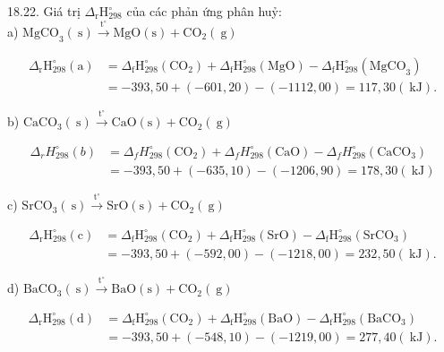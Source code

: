 \documentclass[10pt]{article}
\begin{document}
18.22. Giá trị $\Delta_{\mathrm{r}} \mathrm{H}_{298}^{\circ}$ của các phản ứng phân huỷ:\\
a) $\mathrm{MgCO}_{3}(\mathrm{~s}) \xrightarrow{\mathrm{t}^{\circ}} \mathrm{MgO}(\mathrm{s})+\mathrm{CO}_{2}(\mathrm{~g})$

$$
\begin{aligned}
\Delta_{\mathrm{r}} \mathrm{H}_{298}^{\circ}(\mathrm{a}) & =\Delta_{\mathrm{f}} \mathrm{H}_{298}^{\circ}\left(\mathrm{CO}_{2}\right)+\Delta_{\mathrm{f}} \mathrm{H}_{298}^{\circ}(\mathrm{MgO})-\Delta_{\mathrm{f}} \mathrm{H}_{298}^{\circ}\left(\mathrm{MgCO}_{3}\right) \\
& =-393,50+(-601,20)-(-1112,00)=117,30(\mathrm{~kJ}) .
\end{aligned}
$$

b) $\mathrm{CaCO}_{3}(\mathrm{~s}) \xrightarrow{\mathrm{t}^{\circ}} \mathrm{CaO}(\mathrm{s})+\mathrm{CO}_{2}(\mathrm{~g})$

$$
\begin{aligned}
\Delta_{r} H_{298}^{\circ}(b) & =\Delta_{f} H_{298}^{\circ}\left(\mathrm{CO}_{2}\right)+\Delta_{f} H_{298}^{\circ}(\mathrm{CaO})-\Delta_{f} H_{298}^{\circ}\left(\mathrm{CaCO}_{3}\right) \\
& =-393,50+(-635,10)-(-1206,90)=178,30(\mathrm{~kJ})
\end{aligned}
$$

c) $\mathrm{SrCO}_{3}(\mathrm{~s}) \xrightarrow{\mathrm{t}^{\circ}} \mathrm{SrO}(\mathrm{s})+\mathrm{CO}_{2}(\mathrm{~g})$

$$
\begin{aligned}
\Delta_{\mathrm{r}} \mathrm{H}_{298}^{\circ}(\mathrm{c}) & =\Delta_{\mathrm{f}} \mathrm{H}_{298}^{\circ}\left(\mathrm{CO}_{2}\right)+\Delta_{\mathrm{f}} \mathrm{H}_{298}^{\circ}(\mathrm{SrO})-\Delta_{\mathrm{f}} \mathrm{H}_{298}^{\circ}\left(\mathrm{SrCO}_{3}\right) \\
& =-393,50+(-592,00)-(-1218,00)=232,50(\mathrm{~kJ}) .
\end{aligned}
$$

d) $\mathrm{BaCO}_{3}(\mathrm{~s}) \xrightarrow{\mathrm{t}^{\circ}} \mathrm{BaO}(\mathrm{s})+\mathrm{CO}_{2}(\mathrm{~g})$

$$
\begin{aligned}
\Delta_{\mathrm{r}} \mathrm{H}_{298}^{\circ}(\mathrm{d}) & =\Delta_{\mathrm{f}} \mathrm{H}_{298}^{\circ}\left(\mathrm{CO}_{2}\right)+\Delta_{\mathrm{f}} \mathrm{H}_{298}^{\circ}(\mathrm{BaO})-\Delta_{\mathrm{f}} \mathrm{H}_{298}^{\circ}\left(\mathrm{BaCO}_{3}\right) \\
& =-393,50+(-548,10)-(-1219,00)=277,40(\mathrm{~kJ}) .
\end{aligned}
$$
\end{document}
